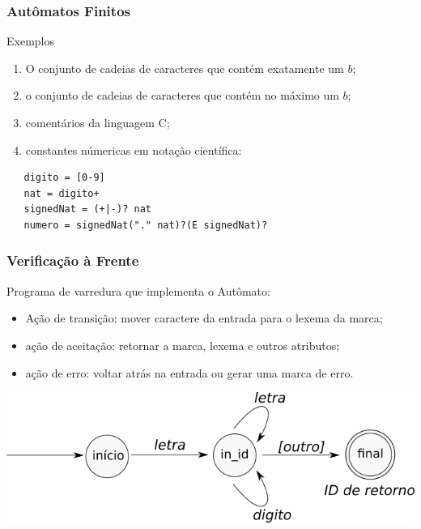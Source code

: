 \documentclass[table]{beamer}
\begin{document}
\begin{frame}[fragile]
   \frametitle{Autômatos Finitos}
   \begin{block}{Exemplos}
      \begin{enumerate}
         \item O conjunto de cadeias de caracteres que contém exatamente um $b$;
	 \item o conjunto de cadeias de caracteres que contém no máximo um $b$;
	 \item comentários da linguagem C;
	 \item constantes númericas em notação científica: 
      \end{enumerate}
   \end{block}
   \begin{verbatim}
   digito = [0-9]
   nat = digito+
   signedNat = (+|-)? nat
   numero = signedNat("." nat)?(E signedNat)?
   \end{verbatim}
\end{frame}

\begin{frame}
   \frametitle{Verificação à Frente}
   \begin{block}{Programa de varredura que implementa o Autômato:}
      \begin{itemize}
         \item Ação de transição: mover caractere da entrada para o lexema da marca;
	 \item ação de aceitação: retornar a marca, lexema e outros atributos;
	 \item ação de erro: voltar atrás na entrada ou gerar uma marca de erro.
      \end{itemize}
   \end{block}
   \includegraphics[width=\linewidth,height=\textheight,keepaspectratio]{figuras/automatodelimitador.png}
\end{frame}
\end{document}
